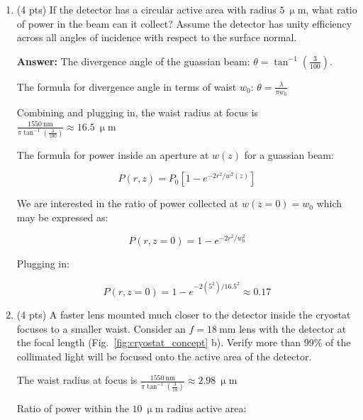 \documentclass[11pt]{caltech_thesis} %
\begin{document}
\begin{enumerate}
\def\labelenumi{\arabic{enumi}.}
\item
  (4 pts) If the detector has a circular active area with radius
  \(5~\mathrm{\upmu m}\), what ratio of power in the beam can it
  collect? Assume the detector has unity efficiency across all angles of
  incidence with respect to the surface normal.

  {\color{midnightblue}  \textbf{Answer:} } {\color{midnightblue}  The
  divergence angle of the guassian beam:
  \(\theta = \tan^{-1}({\frac{3}{100}})\). }

  {\color{midnightblue}  The formula for divergence angle in terms of
  waist \(w_0\): \(\theta = \frac{\lambda}{\pi w_0}\) }

  {\color{midnightblue}  Combining and plugging in, the waist radius at
  focus is
  \(\frac{1550~\mathrm{nm}}{\pi \tan^{-1}(\frac{3}{100})} \approx 16.5~ \mathrm{\upmu m}\)
  }

  {\color{midnightblue}  The formula for power inside an aperture at
  \(w(z)\) for a guassian beam:}

  {\color{midnightblue} 

  \[P(r, z)=P_{0}\left[1-e^{-2 r^{2} / w^{2}(z)}\right]\]

  }

  {\color{midnightblue} We are interested in the ratio of power
  collected at \(w(z=0) = w_0\) which may be expressed as:}

  {\color{midnightblue} 

  \[P(r, z=0)=1-e^{-2 r^{2} / w_0^{2}}\]

  }

  {\color{midnightblue} Plugging in: }

  {\color{midnightblue} 

  \[P(r, z=0)=1-e^{-2(5^{2}) / 16.5^{2}} \approx  \boxed{0.17} \]

  }
\item
  (4 pts) A faster lens mounted much closer to the detector inside the
  cryostat focuses to a smaller waist. Consider an
  \(f = 18~\mathrm{mm}\) lens with the detector at the focal length
  (Fig.~\ref{fig:cryostat_concept} b). Verify more than 99\% of the
  collimated light will be focused onto the active area of the detector.

  {\color{midnightblue}  The waist radius at focus is
  \(\frac{1550~\mathrm{nm}}{\pi \tan^{-1}(\frac{3}{18})} \approx 2.98~\mathrm{\upmu m}\)
  }

  {\color{midnightblue} Ratio of power within the
  \(10~\mathrm{\upmu m}\) radius active area: }


\end{enumerate}
\end{document}
